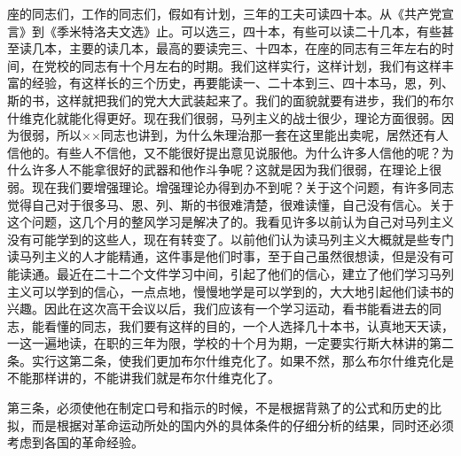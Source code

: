 座的同志们，工作的同志们，假如有计划，三年的工夫可读四十本。从《共产党宣言》到《季米特洛夫文选》止。可以选三，四十本，有些可以读二十几本，有些甚至读几本，主要的读几本，最高的要读完三、十四本，在座的同志有三年左右的时间，在党校的同志有十个月左右的时期。我们这样实行，这样计划，我们有这样丰富的经验，有这样长的三个历史，再要能读一、二十本到三、四十本马，恩，列、斯的书，这样就把我们的党大大武装起来了。我们的面貌就要有进步，我们的布尔什维克化就能化得更好。现在我们很弱，马列主义的战士很少，理论方面很弱。因为很弱，所以××同志也讲到，为什么朱理治那一套在这里能出卖呢，居然还有人信他的。有些人不信他，又不能很好提出意见说服他。为什么许多人信他的呢？为什么许多人不能拿很好的武器和他作斗争呢？这就是因为我们很弱，在理论上很弱。现在我们要增强理论。增强理论办得到办不到呢？关于这个问题，有许多同志觉得自己对于很多马、恩、列、斯的书很难清楚，很难读懂，自己没有信心。关于这个问题，这几个月的整风学习是解决了的。我看见许多以前认为自己对马列主义没有可能学到的这些人，现在有转变了。以前他们认为读马列主义大概就是些专门读马列主义的人才能精通，这件事是他们时事，至于自己虽然很想读，但是没有可能读通。最近在二十二个文件学习中间，引起了他们的信心，建立了他们学习马列主义可以学到的信心，一点点地，慢慢地学是可以学到的，大大地引起他们读书的兴趣。因此在这次高干会议以后，我们应该有一个学习运动，看书能看进去的同志，能看懂的同志，我们要有这样的目的，一个人选择几十本书，认真地天天读，一这一遍地读，在职的三年为限，学校的十个月为期，一定要实行斯大林讲的第二条。实行这第二条，使我们更加布尔什维克化了。如果不然，那么布尔什维克化是不能那样讲的，不能讲我们就是布尔什维克化了。

第三条，必须使他在制定口号和指示的时候，不是根据背熟了的公式和历史的比拟，而是根据对革命运动所处的国内外的具体条件的仔细分析的结果，同时还必须考虑到各国的革命经验。

